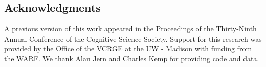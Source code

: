 \documentclass[12pt]{article}
\begin{document}
\begin{flushleft}
\clearpage




\section{Acknowledgments}
A previous version of this work appeared in the Proceedings of the Thirty-Ninth Annual Conference of the Cognitive Science Society. Support for this research was provided by the Office of the VCRGE at the UW - Madison with funding from the WARF. We thank Alan Jern and Charles Kemp for providing code and data.



\end{flushleft}


\clearpage


\clearpage
\end{document}
